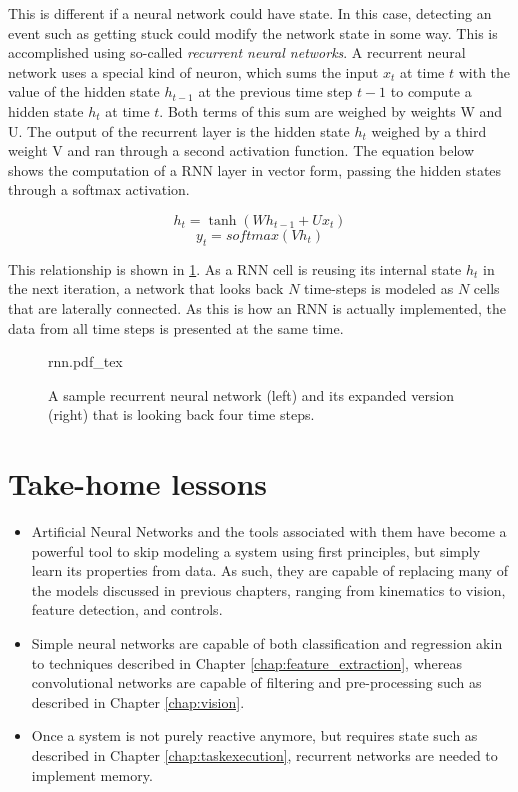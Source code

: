 This is different if a neural network could have state. In this case, detecting an event such as getting stuck could modify the network state in some way. This is accomplished using so-called \textsl{recurrent neural networks}. A recurrent neural network uses a special kind of neuron, which sums the input $x_t$ at time $t$ with the value of the hidden state $h_{t-1}$ at the previous time step $t-1$ to compute a hidden state $h_t$ at time $t$. Both terms of this sum are weighed by weights W and U. The output of the recurrent layer is the hidden state $h_t$ weighed by a third weight V and ran through a second activation function. The equation below shows the computation of a RNN layer in vector form, passing the hidden states through a softmax activation.

\begin{equation}
h_t = \tanh(Wh_{t-1}+Ux_t)
\end{equation}
\begin{equation}
y_t = softmax(Vh_t)
\end{equation}

This relationship is shown in \cref{fig:rnn}. As a RNN cell is reusing its internal state $h_t$ in the next iteration, a network that looks back $N$ time-steps is modeled as $N$ cells that are laterally connected. As this is how an RNN is actually implemented, the data from all time steps is presented at the same time.

\begin{figure}[htb]
\tiny
    \centering
    \def\svgwidth{\textwidth}
    {rnn.pdf_tex}
    \caption{A sample recurrent neural network (left) and its expanded version (right) that is looking back four time steps. \label{fig:rnn}}
\end{figure}

\section*{Take-home lessons}
\begin{itemize}
\item Artificial Neural Networks and the tools associated with them have become a powerful tool to skip modeling a system using first principles, but simply learn its properties from data. As such, they are capable of replacing many of the models discussed in previous chapters, ranging from kinematics to vision, feature detection, and controls.
\item Simple neural networks are capable of both classification and regression akin to techniques described in Chapter \ref{chap:feature_extraction}, whereas convolutional networks are capable of filtering and pre-processing  such as described in Chapter \ref{chap:vision}.
\item Once a system is not purely reactive anymore, but requires state such as described in Chapter \ref{chap:taskexecution}, recurrent networks are needed to implement memory. 
\end{itemize}
